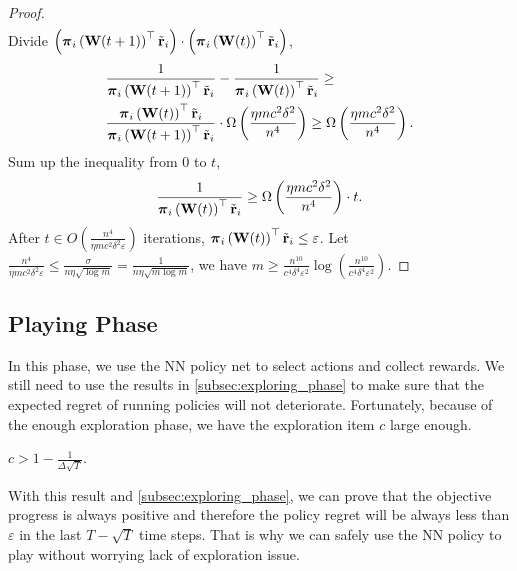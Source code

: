 \begin{proof}
\begin{equation*}
\begin{split}
\end{split}
\end{equation*}
Divide $\left( {\boldsymbol{\pi}}_i\left( {\mathbf{W}}(t+1) \right)^\top {\tilde{\mathbf{r}}}_i\right) \cdot \left( {\boldsymbol{\pi}}_i\left( {\mathbf{W}}(t) \right)^\top {\tilde{\mathbf{r}}}_i \right)$,
\begin{equation*}
\begin{split}
    &\frac{1}{{\boldsymbol{\pi}}_i\left( {\mathbf{W}}(t+1) \right)^\top {\tilde{\mathbf{r}}}_i} - \frac{1}{{\boldsymbol{\pi}}_i\left( {\mathbf{W}}(t) \right)^\top {\tilde{\mathbf{r}}}_i} \ge \\
    &\frac{{\boldsymbol{\pi}}_i\left( {\mathbf{W}}(t) \right)^\top {\tilde{\mathbf{r}}}_i}{{\boldsymbol{\pi}}_i\left( {\mathbf{W}}(t+1) \right)^\top {\tilde{\mathbf{r}}}_i} \cdot \Omega\left( \frac{\eta m c^2 \delta^2}{n^4} \right) \ge \Omega\left( \frac{\eta m c^2 \delta^2}{n^4} \right).
\end{split}
\end{equation*}
Sum up the inequality from $0$ to $t$,
\begin{equation*}
\begin{split}
    \frac{1}{{\boldsymbol{\pi}}_i\left( {\mathbf{W}}(t) \right)^\top {\tilde{\mathbf{r}}}_i} \ge \Omega\left( \frac{\eta m c^2 \delta^2}{n^4} \right) \cdot t.
\end{split}
\end{equation*}
After $t \in O\left( \frac{n^4}{\eta m c^2 \delta^2 \varepsilon} \right)$ iterations, ${\boldsymbol{\pi}}_i\left( {\mathbf{W}}(t) \right)^\top {\tilde{\mathbf{r}}}_i \le \varepsilon$. Let $\frac{n^4}{\eta m c^2 \delta^2 \varepsilon} \le \frac{\sigma}{n \eta \sqrt{\log{m}}} = \frac{1}{n \eta \sqrt{m \log{m}}}$, we have $m \ge \frac{n^{10}}{c^4 \delta^4 \varepsilon^2}\log{\left( \frac{n^{10}}{c^4 \delta^4 \varepsilon^2} \right)}$.
\end{proof}

\subsection{Playing Phase}
\label{subsec:playing_phase}

In this phase, we use the NN policy net to select actions and collect rewards. We still need to use the  results in \cref{subsec:exploring_phase} to make sure that the expected regret of running policies will not deteriorate. Fortunately, because of the enough exploration phase, we have the exploration item $c$ large enough.

\begin{lem}
    $c > 1 - \frac{1}{\Delta \sqrt{T}}$.
\end{lem}

With this result and \cref{subsec:exploring_phase}, we can prove that the objective progress is always positive and therefore the policy regret will be always less than $\varepsilon$ in the last $T - \sqrt{T}$ time steps. That is why we can safely use the NN policy to play without worrying lack of exploration issue.

